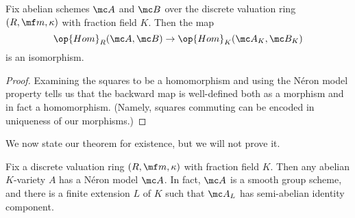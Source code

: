 \documentclass[../notes.tex]{subfiles}
\begin{document}
\begin{corollary}
	Fix abelian schemes $\mc A$ and $\mc B$ over the discrete valuation ring $(R,\mf m,\kappa)$ with fraction field $K$. Then the map
	\[\op{Hom}_R(\mc A,\mc B)\to\op{Hom}_K(\mc A_K,\mc B_K)\]
	is an isomorphism.
\end{corollary}
\begin{proof}
	Examining the squares to be a homomorphism and using the N\'eron model property tells us that the backward map is well-defined both as a morphism and in fact a homomorphism. (Namely, squares commuting can be encoded in uniqueness of our morphisms.)
\end{proof}
We now state our theorem for existence, but we will not prove it.
\begin{theorem}
	Fix a discrete valuation ring $(R,\mf m,\kappa)$ with fraction field $K$. Then any abelian $K$-variety $A$ has a N\'eron model $\mc A$. In fact, $\mc A$ is a smooth group scheme, and there is a finite extension $L$ of $K$ such that $\mc A_L$ has semi-abelian identity component.
\end{theorem}
\end{document}
